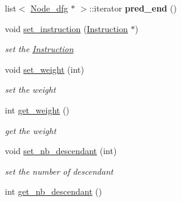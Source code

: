 \begin{DoxyCompactItemize}
\item 
\hypertarget{classNode__dfg_a86fc141e0697ae944900625212579957}{list$<$ \hyperlink{classNode__dfg}{\-Node\-\_\-dfg} $\ast$ $>$\-::iterator {\bfseries pred\-\_\-end} ()}\label{classNode__dfg_a86fc141e0697ae944900625212579957}

\item 
\hypertarget{classNode__dfg_a83747917d9c87b11633779731bcda162}{void \hyperlink{classNode__dfg_a83747917d9c87b11633779731bcda162}{set\-\_\-instruction} (\hyperlink{classInstruction}{\-Instruction} $\ast$)}\label{classNode__dfg_a83747917d9c87b11633779731bcda162}

\begin{DoxyCompactList}\small\item\em set the \hyperlink{classInstruction}{\-Instruction} \end{DoxyCompactList}\item 
\hypertarget{classNode__dfg_af23f48b1521a90178cc5c9a59da3ab3c}{void \hyperlink{classNode__dfg_af23f48b1521a90178cc5c9a59da3ab3c}{set\-\_\-weight} (int)}\label{classNode__dfg_af23f48b1521a90178cc5c9a59da3ab3c}

\begin{DoxyCompactList}\small\item\em set the weight \end{DoxyCompactList}\item 
\hypertarget{classNode__dfg_a561e80f51cb9a71b22f22e8d2e6685de}{int \hyperlink{classNode__dfg_a561e80f51cb9a71b22f22e8d2e6685de}{get\-\_\-weight} ()}\label{classNode__dfg_a561e80f51cb9a71b22f22e8d2e6685de}

\begin{DoxyCompactList}\small\item\em get the weight \end{DoxyCompactList}\item 
\hypertarget{classNode__dfg_a9aa775f727e6c542cd714894219046f3}{void \hyperlink{classNode__dfg_a9aa775f727e6c542cd714894219046f3}{set\-\_\-nb\-\_\-descendant} (int)}\label{classNode__dfg_a9aa775f727e6c542cd714894219046f3}

\begin{DoxyCompactList}\small\item\em set the number of descendant \end{DoxyCompactList}\item 
\hypertarget{classNode__dfg_a9baa0a6be056b7d1ee290c404f2216f5}{int \hyperlink{classNode__dfg_a9baa0a6be056b7d1ee290c404f2216f5}{get\-\_\-nb\-\_\-descendant} ()}\label{classNode__dfg_a9baa0a6be056b7d1ee290c404f2216f5}


\end{DoxyCompactItemize}

